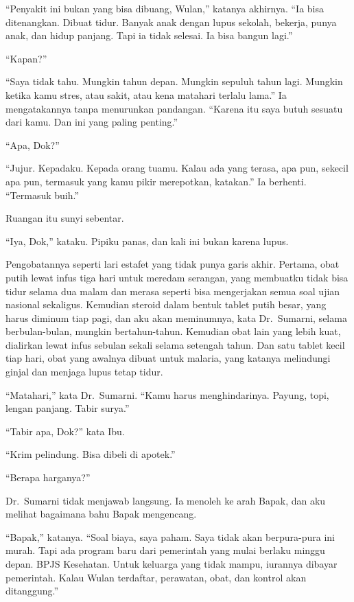 \documentclass[11pt,twoside,openany]{book}
\makeatletter
\newcommand{\scenebreak}{\par\vspace{0.9em}{\centering\textsc{*\hspace{0.7em}*\hspace{0.7em}*}\par}\vspace{0.9em}\@afterindentfalse\@afterheading}
\makeatother
\begin{document}
``Penyakit ini bukan yang bisa dibuang, Wulan,'' katanya akhirnya. ``Ia bisa ditenangkan. Dibuat tidur. Banyak anak dengan lupus sekolah, bekerja, punya anak, dan hidup panjang. Tapi ia tidak selesai. Ia bisa bangun lagi.''

``Kapan?''

``Saya tidak tahu. Mungkin tahun depan. Mungkin sepuluh tahun lagi. Mungkin ketika kamu stres, atau sakit, atau kena matahari terlalu lama.'' Ia mengatakannya tanpa menurunkan pandangan. ``Karena itu saya butuh sesuatu dari kamu. Dan ini yang paling penting.''

``Apa, Dok?''

``Jujur. Kepadaku. Kepada orang tuamu. Kalau ada yang terasa, apa pun, sekecil apa pun, termasuk yang kamu pikir merepotkan, katakan.'' Ia berhenti. ``Termasuk buih.''

Ruangan itu sunyi sebentar.

``Iya, Dok,'' kataku. Pipiku panas, dan kali ini bukan karena lupus.

\scenebreak
Pengobatannya seperti lari estafet yang tidak punya garis akhir. Pertama, obat putih lewat infus tiga hari untuk meredam serangan, yang membuatku tidak bisa tidur selama dua malam dan merasa seperti bisa mengerjakan semua soal ujian nasional sekaligus. Kemudian steroid dalam bentuk tablet putih besar, yang harus diminum tiap pagi, dan aku akan meminumnya, kata Dr.~Sumarni, selama berbulan-bulan, mungkin bertahun-tahun. Kemudian obat lain yang lebih kuat, dialirkan lewat infus sebulan sekali selama setengah tahun. Dan satu tablet kecil tiap hari, obat yang awalnya dibuat untuk malaria, yang katanya melindungi ginjal dan menjaga lupus tetap tidur.

``Matahari,'' kata Dr.~Sumarni. ``Kamu harus menghindarinya. Payung, topi, lengan panjang. Tabir surya.''

``Tabir apa, Dok?'' kata Ibu.

``Krim pelindung. Bisa dibeli di apotek.''

``Berapa harganya?''

Dr.~Sumarni tidak menjawab langsung. Ia menoleh ke arah Bapak, dan aku melihat bagaimana bahu Bapak mengencang.

``Bapak,'' katanya. ``Soal biaya, saya paham. Saya tidak akan berpura-pura ini murah. Tapi ada program baru dari pemerintah yang mulai berlaku minggu depan. BPJS Kesehatan. Untuk keluarga yang tidak mampu, iurannya dibayar pemerintah. Kalau Wulan terdaftar, perawatan, obat, dan kontrol akan ditanggung.''
\end{document}
